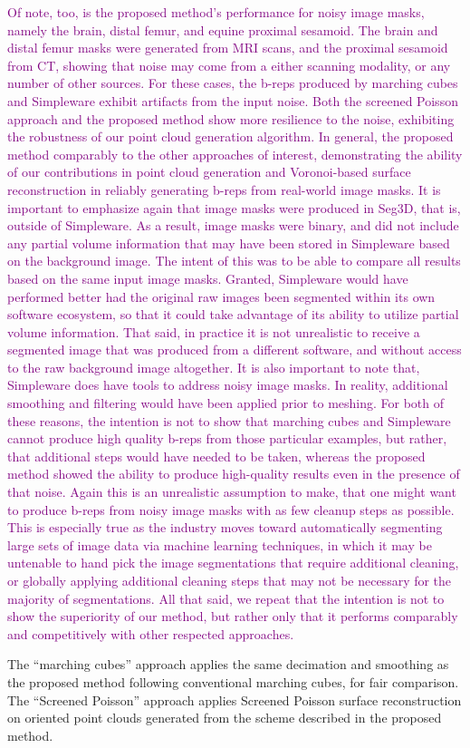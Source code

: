 \textcolor{purple}{Of note, too, is the proposed method's performance for noisy image masks, namely the brain, distal femur, and equine proximal sesamoid. The brain and distal femur masks were generated from MRI scans, and the proximal sesamoid from CT, showing that noise may come from a either scanning modality, or any number of other sources. For these cases, the b-reps produced by marching cubes and Simpleware exhibit artifacts from the input noise. Both the screened Poisson approach and the proposed method show more resilience to the noise, exhibiting the robustness of our point cloud generation algorithm. In general, the proposed method comparably to the other approaches of interest, demonstrating the ability of our contributions in point cloud generation and Voronoi-based surface reconstruction in reliably generating b-reps from real-world image masks.
%
It is important to emphasize again that image masks were produced in Seg3D, that is, outside of Simpleware. As a result, image masks were binary, and did not include any partial volume information that may have been stored in Simpleware based on the background image. The intent of this was to be able to compare all results based on the same input image masks. Granted, Simpleware would have performed better had the original raw images been segmented within its own software ecosystem, so that it could take advantage of its ability to utilize partial volume information. That said, in practice it is not unrealistic to receive a segmented image that was produced from a different software, and without access to the raw background image altogether. It is also important to note that, Simpleware does have tools to address noisy image masks. In reality, additional smoothing and filtering would have been applied prior to meshing. For both of these reasons, the intention is not to show that marching cubes and Simpleware cannot produce high quality b-reps from those particular examples, but rather, that additional steps would have needed to be taken, whereas the proposed method showed the ability to produce high-quality results even in the presence of that noise. Again this is an unrealistic assumption to make, that one might want to produce b-reps from noisy image masks with as few cleanup steps as possible. This is especially true as the industry moves toward automatically segmenting large sets of image data via machine learning techniques, in which it may be untenable to hand pick the image segmentations that require additional cleaning, or globally applying additional cleaning steps that may not be necessary for the majority of segmentations. All that said, we repeat that the intention is not to show the superiority of our method, but rather only that it performs comparably and competitively with other respected approaches.}

The ``marching cubes'' approach applies the same decimation and smoothing as the proposed method following conventional marching cubes, for fair comparison. The ``Screened Poisson'' approach applies Screened Poisson surface reconstruction on oriented point clouds generated from the scheme described in the proposed method.